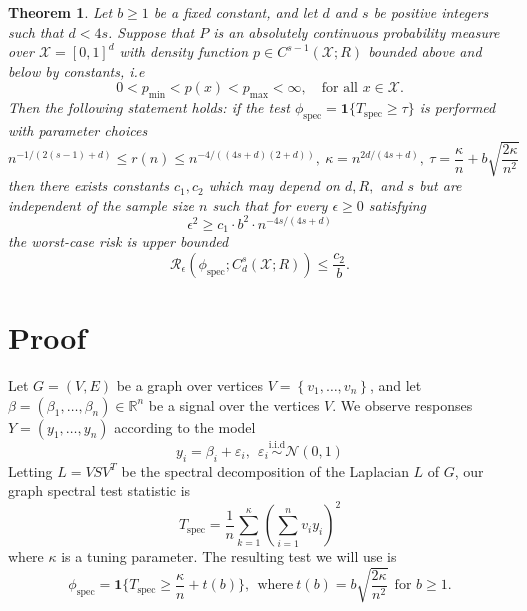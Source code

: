 \documentclass{article}
\newcommand{\Reals}{\mathbb{R}}
\newcommand{\set}[1]{\left\{#1\right\}}
\newcommand{\1}{\mathbf{1}}
\newcommand{\spec}{\mathrm{spec}}
\theoremstyle{alden}
\theoremstyle{aldenthm}
\newtheorem{theorem}{Theorem}
\theoremstyle{definition}
\theoremstyle{remark}
\begin{document}
	\begin{theorem}
		\label{thm:higher_order_holder_testing_rate}
		Let $b \geq 1$ be a fixed constant, and let $d$ and $s$ be positive integers such that $d < 4s$. Suppose that $P$ is an absolutely continuous probability measure over $\mathcal{X} = [0,1]^d$ with density function $p \in C^{s-1}(\mathcal{X};R)$ bounded above and below by constants, i.e
		\begin{equation*}
		0 < p_{\min} < p(x) < p_{\max} < \infty, \quad \textrm{for all $x \in \mathcal{X}$.}
		\end{equation*}
		Then the following statement holds: if the test $\phi_{\spec} = \1\{T_{\spec} \geq \tau \}$ is performed with parameter choices 
		\begin{equation*}
		n^{-1/(2(s - 1) + d)} \leq r(n) \leq n^{-4/((4s + d)(2+d))}, ~\kappa = n^{2d/(4s + d)}, ~\tau = \frac{\kappa}{n} + b\sqrt{\frac{2\kappa}{n^2}}
		\end{equation*}
		then there exists constants $c_1,c_2$ which may depend on $d,R,$ and $s$ but are independent of the sample size $n$ such that for every $\epsilon \geq 0$ satisfying
		\begin{equation}
		\label{eqn:higher_order_holder_testing_rate}
		\epsilon^2 \geq c_1 \cdot b^2 \cdot n^{-4s/(4s + d)}
		\end{equation}
		the worst-case risk is upper bounded
		\begin{equation}
		\label{eqn:higher_order_holder_testing_rate_1}
		\mathcal{R}_{\epsilon}(\phi_{\mathrm{spec}}; C_d^{s}(\mathcal{X};R)) \leq \frac{c_2}{b}.
		\end{equation}
	\end{theorem}

\section{Proof}
Let $G = (V,E)$ be a graph over vertices $V = \set{v_1,\ldots,v_n}$, and let $\beta = (\beta_1,\ldots,\beta_n) \in \Reals^n$ be a signal over the vertices $V$. We observe responses $Y = (y_1,\ldots,y_n)$ according to the model
\begin{equation*}
y_i = \beta_i + \varepsilon_i, ~~ \varepsilon_i \overset{\textrm{i.i.d}}{\sim} \mathcal{N}(0,1)
\end{equation*}
Letting $L = VSV^T$ be the spectral decomposition of the Laplacian $L$ of $G$, our graph spectral test statistic is 
\begin{equation*}
T_{\spec} = \frac{1}{n}\sum_{k = 1}^{\kappa} \left(\sum_{i = 1}^{n} v_i y_i\right)^2
\end{equation*}
where $\kappa$ is a tuning parameter. The resulting test we will use is
\begin{equation*}
\phi_{\spec} = \1\{T_{\spec} \geq \frac{\kappa}{n} + t(b)\},~~\textrm{where}~ t(b) = b\sqrt{\frac{2\kappa}{n^2}}~~\textrm{for $b \geq 1$.}
\end{equation*}
\end{document}

